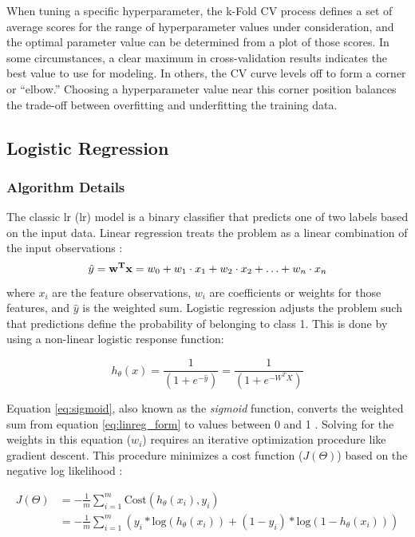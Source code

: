 When tuning a specific hyperparameter, the k-Fold CV process defines a set of average scores for the range of hyperparameter values under consideration, and the optimal parameter value can be determined from a plot of those scores. In some circumstances, a clear maximum in cross-validation results indicates the best value to use for modeling. In others, the CV curve levels off to form a corner or ``elbow.'' Choosing a hyperparameter value near this corner position balances the trade-off between overfitting and underfitting the training data.

\subsection{Logistic Regression}\label{ch3:logistic_regression}
\subsubsection{Algorithm Details} \label{ch3:lr_details}
The classic \acrlong{lr} (\acrshort{lr}) model is a binary classifier that predicts one of two labels based on the input data. Linear regression treats the problem as a linear combination of the input observations \citep[p.\ 369]{bertsimas_analytics_2016}:
\begin{equation}
\label{eq:linreg_form}
    \hat{y} = {\bf{w^Tx}} = w_0 + w_1 \cdot x_1 + w_2 \cdot x_2 + \ldots + w_n \cdot x_n 
\end{equation}
where $x_i$ are the feature observations, $w_i$ are coefficients or weights for those features, and $\hat{y}$ is the weighted sum. Logistic regression adjusts the problem such that predictions define the probability of belonging to class 1. This is done by using a non-linear logistic response function: 

\begin{equation}
\label{eq:sigmoid}
h_{\theta}(x) = \frac{1}{(1+e^{-\hat{y}})} = \frac{1}{(1+e^{-W^TX})}
\end{equation}

Equation \ref{eq:sigmoid}, also known as the \textit{sigmoid} function, converts the weighted sum from equation \ref{eq:linreg_form} to values between 0 and 1 \citep[p.\ 369]{bertsimas_analytics_2016}. Solving for the weights in this equation ($w_i$) requires an iterative optimization procedure like gradient descent. This procedure minimizes a cost function ($J(\Theta)$) based on the negative log likelihood \citep{ng_logistic_2011}:

\begin{equation}
\label{eq:logreg_cost}
\begin{aligned}
        J(\Theta) &= -\frac{1}{m} \sum_{i=1}^{m}{\text{Cost}(h_{\theta}(x_i),y_i)} \\ &= -\frac{1}{m}\sum_{i=1}^{m}{(y_i*\text{log}({h_{\theta}(x_i)})+(1-y_i)*\text{log}(1-h_{\theta}(x_i)))}
\end{aligned}
\end{equation}

